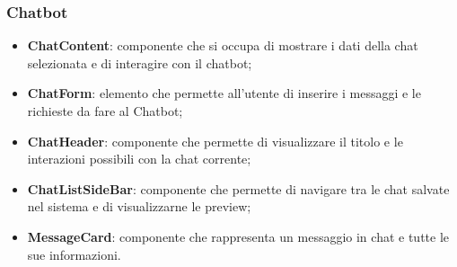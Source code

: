 \documentclass[10pt, a4paper]{article}
\begin{document}
\subsubsection{Chatbot}
\begin{itemize} 
    \item \label{ChatContent}\textbf{ChatContent}: componente che si occupa di mostrare i dati della chat selezionata e di interagire con il chatbot;
    \item \label{ChatForm}\textbf{ChatForm}: elemento che permette all'utente di inserire i messaggi e le richieste da fare al Chatbot;
    \item \label{ChatHeader}\textbf{ChatHeader}: componente che permette di visualizzare il titolo e le interazioni possibili con la chat corrente; 
    \item \label{ChatListSideBar}\textbf{ChatListSideBar}: componente che permette di navigare tra le chat salvate nel sistema e di visualizzarne le preview;
    \item \label{MessageCard}\textbf{MessageCard}: componente che rappresenta un messaggio in chat e tutte le sue informazioni.  
\end{itemize}
\end{document}
